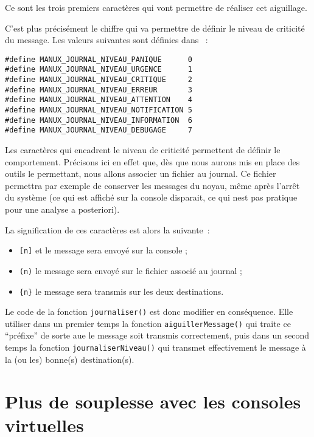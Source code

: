    Ce sont les trois premiers caractères qui vont permettre de
réaliser cet aiguillage.

   C'est plus précisément le chiffre qui va permettre de définir le
niveau de criticité du message. Les valeurs suivantes sont définies
dans ~:

\begin{lstlisting}
#define MANUX_JOURNAL_NIVEAU_PANIQUE      0
#define MANUX_JOURNAL_NIVEAU_URGENCE      1
#define MANUX_JOURNAL_NIVEAU_CRITIQUE     2
#define MANUX_JOURNAL_NIVEAU_ERREUR       3
#define MANUX_JOURNAL_NIVEAU_ATTENTION    4
#define MANUX_JOURNAL_NIVEAU_NOTIFICATION 5
#define MANUX_JOURNAL_NIVEAU_INFORMATION  6
#define MANUX_JOURNAL_NIVEAU_DEBUGAGE     7
\end{lstlisting}  

   Les caractères qui encadrent le niveau de criticité permettent de
définir le comportement. Précisons ici en effet que, dès que nous
aurons mis en place des outils le permettant, nous allons associer un
fichier au journal. Ce fichier permettra par exemple de conserver les
messages du noyau, même après l'arrêt du système (ce qui est affiché
sur la console disparait, ce qui nest pas pratique pour une analyse a
posteriori).

La signification de ces caractères est alors la suivante~:
\begin{itemize}
   \item \lstinline![n]! et le message sera envoyé sur la console ;
   \item \lstinline!(n)! le message sera envoyé sur le fichier
     associé au journal ;
   \item \lstinline!{n}! le message sera transmis sur les deux
      destinations.     
\end{itemize}

   Le code de la fonction \lstinline!journaliser()! est donc modifier
en conséquence. Elle utiliser dans un premier temps la fonction
\lstinline!aiguillerMessage()! qui traite ce ``préfixe'' de sorte aue
le message soit transmis correctement, puis dans un second temps la
fonction \lstinline!journaliserNiveau()! qui transmet effectivement le
message à la (ou les) bonne(s) destination(s).

%
\section{Plus de souplesse avec les consoles virtuelles}

